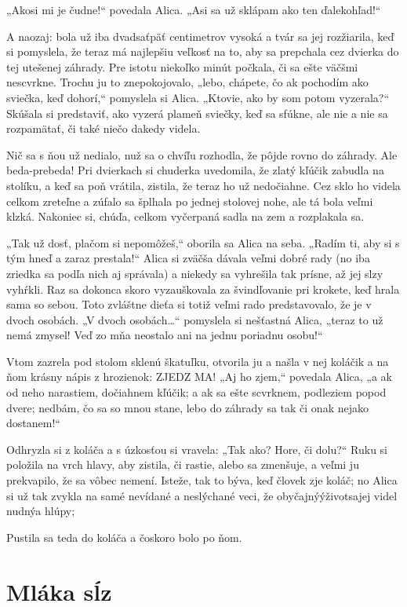 \documentclass[12pt]{book}
\begin{document}
\begin{Parallel}[p]{}{}
{„Akosi mi je čudne!“ povedala Alica. „Asi sa už sklápam ako ten ďalekohľad!“

A naozaj: bola už iba dvadsaťpäť centimetrov vysoká a tvár sa jej rozžiarila, keď si pomyslela, že teraz má najlepšiu veľkosť na to, aby sa prepchala cez dvierka do tej utešenej záhrady. Pre istotu niekoľko minút počkala, či sa ešte väčšmi nescvrkne. Trochu ju to znepokojovalo, „lebo, chápete, čo ak pochodím ako sviečka, keď dohorí,“ pomyslela si Alica. „Ktovie, ako by som potom vyzerala?“ Skúšala si predstaviť, ako vyzerá plameň sviečky, keď sa sfúkne, ale nie a nie sa rozpamätať, či také niečo dakedy videla.

Nič sa s ňou už nedialo, nuž sa o chvíľu rozhodla, že pôjde rovno do záhrady. Ale beda-prebeda! Pri dvierkach si chuderka uvedomila, že zlatý kľúčik zabudla na stolíku, a keď sa poň vrátila, zistila, že teraz ho už nedočiahne. Cez sklo ho videla celkom zreteľne a zúfalo sa šplhala po jednej stolovej nohe, ale tá bola veľmi klzká. Nakoniec si, chúďa, celkom vyčerpaná sadla na zem a rozplakala sa.

„Tak už dosť, plačom si nepomôžeš,“ oborila sa Alica na seba. „Radím ti, aby si s tým hneď a zaraz prestala!“ Alica si zväčša dávala veľmi dobré rady (no iba zriedka sa podľa nich aj správala) a niekedy sa vyhrešila tak prísne, až jej slzy vyhŕkli. Raz sa dokonca skoro vyzauškovala za švindľovanie pri krokete, keď hrala sama so sebou. Toto zvláštne dieťa si totiž veľmi rado predstavovalo, že je v dvoch osobách. „V dvoch osobách…“ pomyslela si nešťastná Alica, „teraz to už nemá zmysel! Veď zo mňa neostalo ani na jednu poriadnu osobu!“

Vtom zazrela pod stolom sklenú škatuľku, otvorila ju a našla v nej koláčik a na ňom krásny nápis z hrozienok: ZJEDZ MA! „Aj ho zjem,“ povedala Alica, „a ak od neho narastiem, dočiahnem kľúčik; a ak sa ešte scvrknem, podleziem popod dvere; nedbám, čo sa so mnou stane, lebo do záhrady sa tak či onak nejako dostanem!“

Odhryzla si z koláča a s úzkosťou si vravela: „Tak ako? Hore, či dolu?“ Ruku si položila na vrch hlavy, aby zistila, či rastie, alebo sa zmenšuje, a veľmi ju prekvapilo, že sa vôbec nemení. Isteže, tak to býva, keď človek zje koláč; no Alica si už tak zvykla na samé nevídané a neslýchané veci, že obyčajnýýživotsajej videl nudnýa hlúpy;

Pustila sa teda do koláča a čoskoro bolo po ňom.

\section{Mláka sĺz}

}
\end{Parallel}
\end{document}
